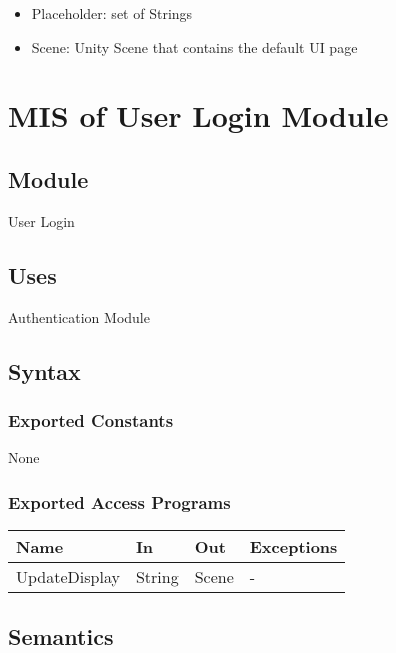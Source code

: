 \documentclass[12pt, titlepage]{article}
\begin{document}
\begin{itemize}
	\item Placeholder: set of Strings
	\item Scene: Unity Scene that contains the default UI page
\end{itemize}

\newpage

\section{MIS of User Login Module} \label{mLogin}

\subsection{Module}

User Login

\subsection{Uses}

Authentication Module

\subsection{Syntax}

\subsubsection{Exported Constants}

None

\subsubsection{Exported Access Programs}

\begin{center}
	\begin{tabular}{p{4cm} p{2cm} p{4cm} p{4cm}}
	\hline
	\textbf{Name} & \textbf{In} & \textbf{Out} & \textbf{Exceptions} \\
	\hline
	UpdateDisplay & String & Scene & - \\
	\hline
	\end{tabular}
\end{center}

\subsection{Semantics}
\end{document}
